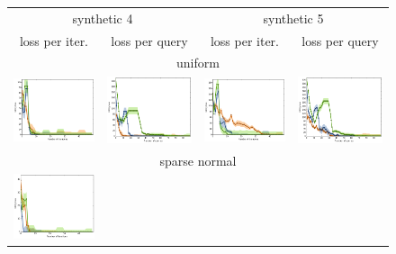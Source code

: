 \documentclass{article}
\renewcommand\[{\begin{equation}}
\renewcommand\]{\end{equation}}
\begin{document}
\begin{figure}[h!]
    \centering
    {\footnotesize
    \begin{tabular}{cccc}
        \hline
        \multicolumn{2}{c}{{\sc synthetic 4}} &
        \multicolumn{2}{c}{{\sc synthetic 5}}
        \\
        {\sc loss per iter.} & {\sc loss per query} & {\sc loss per iter.} & {\sc loss per query}
        \\
        \hline \hline
        \multicolumn{4}{c}{{\sc uniform}}
        \\
        \includegraphics[width=10em]{figures/synthetic_vs_self_4_uniform_per_iter_loss} &
        \includegraphics[width=10em]{figures/synthetic_vs_self_4_uniform_per_query_loss} &
        \includegraphics[width=10em]{figures/synthetic_vs_self_5_uniform_per_iter_loss} &
        \includegraphics[width=10em]{figures/synthetic_vs_self_5_uniform_per_query_loss}
        \\
        \hline
        \multicolumn{4}{c}{{\sc sparse normal}}
        \\
        \includegraphics[width=10em]{figures/synthetic_vs_self_4_normal_sparse_per_iter_loss} &

\end{tabular}}
\end{figure}
\end{document}
